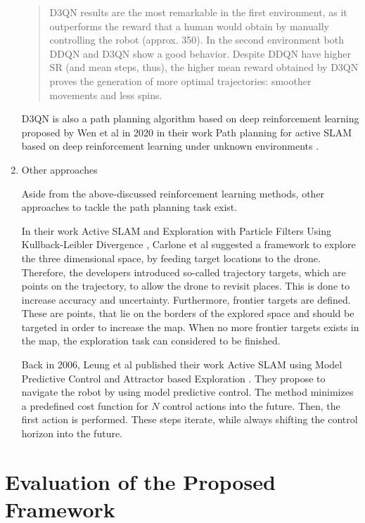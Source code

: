 \begin{enumerate}
\begin{quote}
	D3QN results are the most remarkable in the first environment, as it
outperforms the reward that a human would obtain by manually controlling the robot (approx. 350). In the
second environment both DDQN and D3QN show a good behavior. Despite DDQN have higher SR
(and mean steps, thus), the higher mean reward obtained by D3QN proves the generation of more
optimal trajectories: smoother movements and less spins. \cite{deep}
	\end{quote}
	D3QN is also a path planning algorithm based on deep reinforcement learning proposed by Wen et al in 2020 in their work Path planning for 
	active SLAM based on deep reinforcement learning under unknown environments \cite{accurat}.
	
	\item{Other approaches}
	
	Aside from the above-discussed reinforcement learning methods, other approaches to tackle the path planning task exist. 
	
	In their work Active SLAM and Exploration with Particle Filters Using Kullback-Leibler Divergence \cite{ppap1}, Carlone et al suggested a framework to 
	explore the three dimensional space, by feeding target locations to the drone. Therefore, the developers introduced so-called trajectory targets, which 
	are points on the trajectory, to allow the drone to revisit places. This is done to increase accuracy and uncertainty. Furthermore, frontier targets 
	are defined. These are points, that lie on the borders of the explored space and should be targeted in order to increase the map. When no more frontier 
	targets exists in the map, the exploration task can considered to be finished. 
	
	Back in 2006, Leung et al published their work Active SLAM using Model Predictive Control and Attractor based Exploration \cite{ppap2}. They propose to navigate
	the robot by using model predictive control. The method minimizes a predefined cost function for $N$ control actions into the future. Then, the first action 
	is performed. These steps iterate, while always shifting the control horizon into the future. 

	
	\end{enumerate}
	
	
	\section{Evaluation of the Proposed Framework}
		
